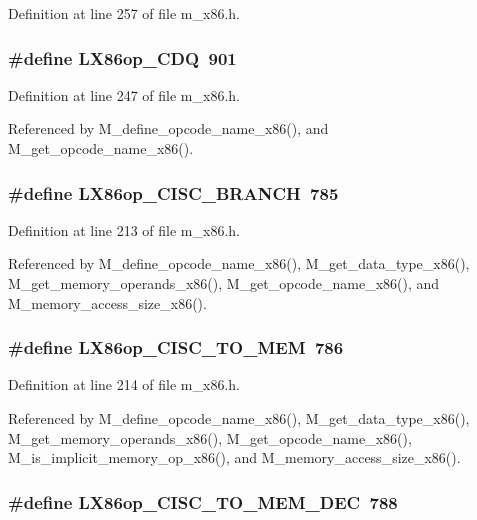 Definition at line 257 of file m\_\-x86.h.
\subsubsection{\setlength{\rightskip}{0pt plus 5cm}\#define LX86op\_\-CDQ~901}\label{m__x86_8h_38fc44faf08411184ef3343454dda026}




Definition at line 247 of file m\_\-x86.h.

Referenced by M\_\-define\_\-opcode\_\-name\_\-x86(), and M\_\-get\_\-opcode\_\-name\_\-x86().
\subsubsection{\setlength{\rightskip}{0pt plus 5cm}\#define LX86op\_\-CISC\_\-BRANCH~785}\label{m__x86_8h_1659be396083cf690d49b2dc1c388053}




Definition at line 213 of file m\_\-x86.h.

Referenced by M\_\-define\_\-opcode\_\-name\_\-x86(), M\_\-get\_\-data\_\-type\_\-x86(), M\_\-get\_\-memory\_\-operands\_\-x86(), M\_\-get\_\-opcode\_\-name\_\-x86(), and M\_\-memory\_\-access\_\-size\_\-x86().
\subsubsection{\setlength{\rightskip}{0pt plus 5cm}\#define LX86op\_\-CISC\_\-TO\_\-MEM~786}\label{m__x86_8h_1ac0ebbb3c9806cfeb5a69a5ab7a12e9}




Definition at line 214 of file m\_\-x86.h.

Referenced by M\_\-define\_\-opcode\_\-name\_\-x86(), M\_\-get\_\-data\_\-type\_\-x86(), M\_\-get\_\-memory\_\-operands\_\-x86(), M\_\-get\_\-opcode\_\-name\_\-x86(), M\_\-is\_\-implicit\_\-memory\_\-op\_\-x86(), and M\_\-memory\_\-access\_\-size\_\-x86().
\subsubsection{\setlength{\rightskip}{0pt plus 5cm}\#define LX86op\_\-CISC\_\-TO\_\-MEM\_\-DEC~788}\label{m__x86_8h_914b84b72eedd96558a9d2687d98a59f}




